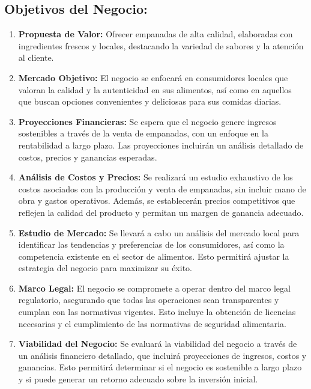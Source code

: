 \documentclass[12pt]{article}
\begin{document}
\subsection{Objetivos del Negocio:}
\begin{enumerate}
    \item \textbf{Propuesta de Valor:} Ofrecer empanadas de alta calidad, elaboradas con ingredientes frescos y locales, destacando la variedad de sabores y la atención al cliente.
    \item \textbf{Mercado Objetivo:} El negocio se enfocará en consumidores locales que valoran la calidad y la autenticidad en sus alimentos, así como en aquellos que buscan opciones convenientes y deliciosas para sus comidas diarias.
    \item \textbf{Proyecciones Financieras:} Se espera que el negocio genere ingresos sostenibles a través de la venta de empanadas, con un enfoque en la rentabilidad a largo plazo. Las proyecciones incluirán un análisis detallado de costos, precios y ganancias esperadas.
    \item \textbf{Análisis de Costos y Precios:} Se realizará un estudio exhaustivo de los costos asociados con la producción y venta de empanadas, sin incluir mano de obra y gastos operativos. Además, se establecerán precios competitivos que reflejen la calidad del producto y permitan un margen de ganancia adecuado.
    \item \textbf{Estudio de Mercado:} Se llevará a cabo un análisis del mercado local para identificar las tendencias y preferencias de los consumidores, así como la competencia existente en el sector de alimentos. Esto permitirá ajustar la estrategia del negocio para maximizar su éxito.
    \item \textbf{Marco Legal:} El negocio se compromete a operar dentro del marco legal regulatorio, asegurando que todas las operaciones sean transparentes y cumplan con las normativas vigentes. Esto incluye la obtención de licencias necesarias y el cumplimiento de las normativas de seguridad alimentaria.
    \item \textbf{Viabilidad del Negocio:} Se evaluará la viabilidad del negocio a través de un análisis financiero detallado, que incluirá proyecciones de ingresos, costos y ganancias. Esto permitirá determinar si el negocio es sostenible a largo plazo y si puede generar un retorno adecuado sobre la inversión inicial.
\end{enumerate}

\newpage
\end{document}
